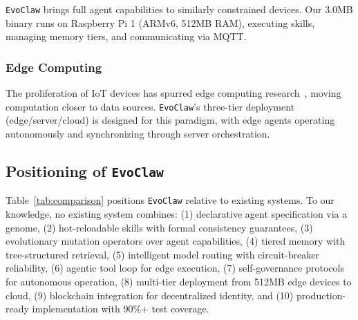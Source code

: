 \documentclass{article}
\newcommand{\evoclaw}{\texttt{EvoClaw}\xspace}
\begin{document}
\evoclaw{} brings full agent capabilities to similarly constrained devices. Our 3.0MB binary runs on Raspberry Pi 1 (ARMv6, 512MB RAM), executing skills, managing memory tiers, and communicating via MQTT.

\subsubsection{Edge Computing}

The proliferation of IoT devices has spurred edge computing research~\cite{shi2016edge}, moving computation closer to data sources. \evoclaw{}'s three-tier deployment (edge/server/cloud) is designed for this paradigm, with edge agents operating autonomously and synchronizing through server orchestration.

\subsection{Positioning of \evoclaw{}}

Table~\ref{tab:comparison} positions \evoclaw{} relative to existing systems. To our knowledge, no existing system combines: (1) declarative agent specification via a genome, (2) hot-reloadable skills with formal consistency guarantees, (3) evolutionary mutation operators over agent capabilities, (4) tiered memory with tree-structured retrieval, (5) intelligent model routing with circuit-breaker reliability, (6) agentic tool loop for edge execution, (7) self-governance protocols for autonomous operation, (8) multi-tier deployment from 512MB edge devices to cloud, (9) blockchain integration for decentralized identity, and (10) production-ready implementation with 90\%+ test coverage.
\end{document}
